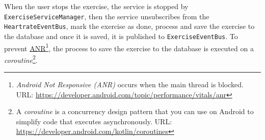 When the user stops the exercise, the service is stopped by \verb;ExerciseServiceManager;, then the service unsubscribes from the \verb;HeartrateEventBus;, mark the exercise as done, process and save the exercise to the database and once it is saved, it is published to \verb;ExerciseEventBus;.
To prevent \url{ANR}\footnote{\emph{Android Not Responsive (ANR)} occurs when the main thread is blocked. URL: \url{https://developer.android.com/topic/performance/vitals/anr}}, the process to save the exercise to the database is executed on a \emph{coroutine}\footnote{A \emph{coroutine} is a concurrency design pattern that you can use on Android to simplify code that executes asynchronously. URL: \url{https://developer.android.com/kotlin/coroutines}}.
